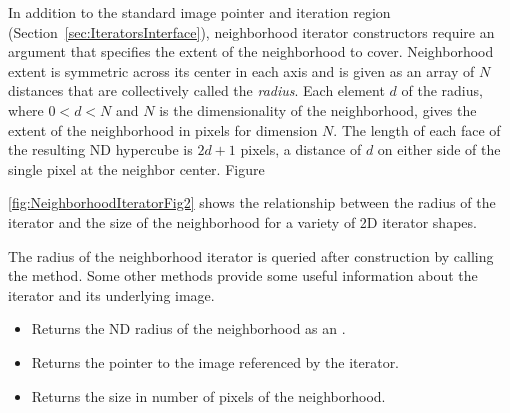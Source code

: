 In addition to the standard image pointer and iteration region
(Section~\ref{sec:IteratorsInterface}), neighborhood iterator constructors
require an argument that specifies the extent of the neighborhood to cover.
Neighborhood extent is symmetric across its center in each
axis and is given as an array of $N$ distances that are collectively called the
\emph{radius}. Each element $d$ of the radius, where $0 < d < N$ and
$N$ is the dimensionality of the neighborhood, gives the extent of the
neighborhood in pixels for dimension $N$.  The length of each face of the
resulting ND hypercube is $2d + 1$ pixels, a distance of $d$ on either side of
the single pixel at the neighbor center.
Figure~{\ref{fig:NeighborhoodIteratorFig2} shows the relationship between the
radius of the iterator and the size of the neighborhood for a variety of 2D
iterator shapes.

The radius of the neighborhood iterator is queried after construction
by calling the  method.  Some other methods provide
some useful information about the iterator and its underlying image.


\begin{itemize}

\item \textbf{} Returns the ND radius of the
neighborhood as an .

\item \textbf{} Returns the pointer to
the image referenced by the iterator.

\item \textbf{} Returns the size in number of 
pixels of the neighborhood.

\end{itemize}

}
